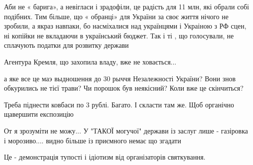 \begin{itemize}
Аби не « барига», а невігласи і зрадофіли, це радість для 11 млн, які обрали
собі подібних. Тим більше, що « обранці» для України за своє життя нічого не
зробили, а якраз навпаки, бо насміхалися над українцями і Украіною з РФ сцен,
ні копійки не вкладаючи в український бюджет. Так і ті , що голосували, не
сплачують податки для розвитку держави


 
Агентура Кремля, що захопила владу, вже не ховається...

 

а яке все це маэ выдношення до 30 рыччя Незалежності України? Вони знов
обкурились не тієї трави? Чи порошок був неякісний? Коли вже це скінчиться?

 
Треба піднести ковбаси по 3 рублі. Багато. І скласти там же. Щоб органічно щавершити експозицію

 

От я зрозуміти не можу... У "ТАКОЇ могучої" держави із заслуг лише - газіровка і
морозиво.... видно більше із приємного немає що згадати


 
Це - демонстрація тупості і ідіотизм від організаторів святкування.


\end{itemize}
